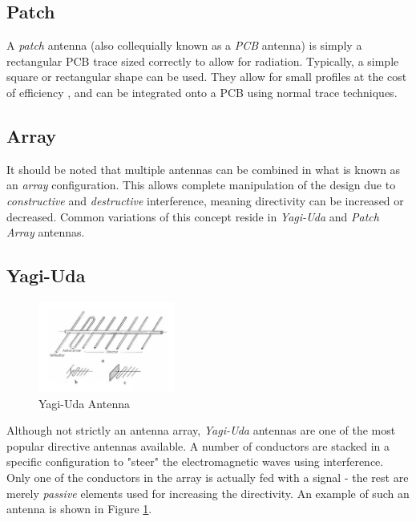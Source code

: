 \subsection{Patch}
A \textit{patch} antenna (also collequially known as a \textit{PCB} antenna) is simply a rectangular PCB trace sized correctly to allow for radiation. Typically, a simple square or rectangular shape can be used. They allow for small profiles at the cost of efficiency \cite{site-antennaTheory}, and can be integrated onto a PCB using normal trace techniques.

\subsection{Array}
It should be noted that multiple antennas can be combined in what is known as an \textit{array} configuration. This allows complete manipulation of the design due to \textit{constructive} and \textit{destructive} interference, meaning directivity can be increased or decreased. Common variations of this concept reside in \textit{Yagi-Uda} and \textit{Patch Array} antennas.

\subsection{Yagi-Uda}
\begin{figure}[!htb]
  \centering
  \includegraphics[width=0.4\textwidth]{yagi}
  \caption{Yagi-Uda Antenna \cite{site-icantennasYagi}}
  \label{fig:yagi}
\end{figure}
Although not strictly an antenna array, \textit{Yagi-Uda} antennas are one of the most popular directive antennas available. A number of conductors are stacked in a specific configuration to "steer" the electromagnetic waves using interference. Only one of the conductors in the array is actually fed with a signal - the rest are merely \textit{passive} elements used for increasing the directivity. An example of such an antenna is shown in Figure \ref{fig:yagi}.

